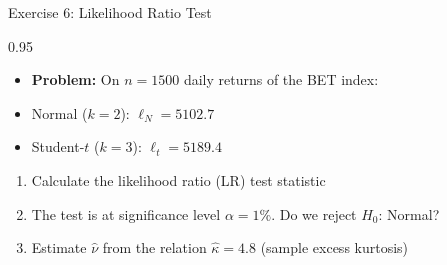 \documentclass[9pt, aspectratio=169, t]{beamer}
\begin{document}
\begin{frame}{Exercise 6: Likelihood Ratio Test}
\begin{cminipage}{0.95\textwidth}
    \begin{itemize}\setlength{\itemsep}{0pt}
        \item \textbf{Problem:} On $n = 1500$ daily returns of the BET index:
    \end{itemize}
    \begin{itemize}\setlength{\itemsep}{0pt}
        \item Normal ($k=2$): $\ell_N = 5102.7$
        \item Student-$t$ ($k=3$): $\ell_t = 5189.4$
    \end{itemize}
    \begin{enumerate}\setlength{\itemsep}{0pt}
        \item Calculate the likelihood ratio (LR) test statistic
        \item The test is at significance level $\alpha = 1\%$. Do we reject $H_0$: Normal?
        \item Estimate $\hat{\nu}$ from the relation $\hat{\kappa} = 4.8$ (sample excess kurtosis)
    \end{enumerate}
\end{cminipage}
\end{frame}
\end{document}
